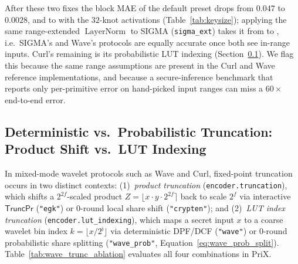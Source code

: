\documentclass[11pt]{article}
\begin{document}
After these two fixes the block MAE of the default preset drops from $0.047$ to $0.0028$, and to \BertBaseDefaultMAE{} with the $32$-knot activations (Table~\ref{tab:keysize}); applying the same range-extended $\operatorname{LayerNorm}$ to SIGMA (\texttt{sigma\_ext}) takes it from \BertBaseSigmaMAE{} to \BertBaseSigmaExtMAE, i.e.\ SIGMA's and Wave's protocols are equally accurate once both see in-range inputs. Curl's remaining \BertBaseCurlMAE{} is its probabilistic LUT indexing (Section~\ref{sec:trunc_discussion}). We flag this because the same range assumptions are present in the Curl and Wave reference implementations, and because a secure-inference benchmark that reports only per-primitive error on hand-picked input ranges can miss a $60\times$ end-to-end error.

\subsection{Deterministic vs.\ Probabilistic Truncation: Product Shift vs.\ LUT Indexing}
\label{sec:trunc_discussion}

In mixed-mode wavelet protocols such as Wave and Curl, fixed-point truncation occurs in two distinct contexts: (1)~\emph{product truncation} (\texttt{encoder.truncation}), which shifts a $2^{2f}$-scaled product $Z = \lfloor x \cdot y \cdot 2^{2f} \rceil$ back to scale $2^f$ via interactive $\mathsf{TruncPr}$ (\texttt{"egk"}) or 0-round local share shift (\texttt{"crypten"}); and (2)~\emph{LUT index truncation} (\texttt{encoder.lut\_indexing}), which maps a secret input $x$ to a coarse wavelet bin index $k = \lfloor x / 2^{\mathfrak{j}} \rfloor$ via deterministic DPF/DCF (\texttt{"wave"}) or 0-round probabilistic share splitting (\texttt{"wave\_prob"}, Equation~\ref{eq:wave_prob_split}). Table~\ref{tab:wave_trunc_ablation} evaluates all four combinations in PriX.

\begin{table}[t]
\centering
\caption{\textbf{Ablation of deterministic vs.\ probabilistic LUT truncation (\texttt{lut\_indexing="wave"} vs.\ \texttt{"wave\_prob"}) and interactive vs.\ local product truncation (\texttt{truncation="egk"} vs.\ \texttt{"crypten"})} in Wave mode (2 parties, CPU, $f=16$).}
\label{tab:wave_trunc_ablation}
\vspace{2pt}
\footnotesize
{}
\end{table}
\end{document}
